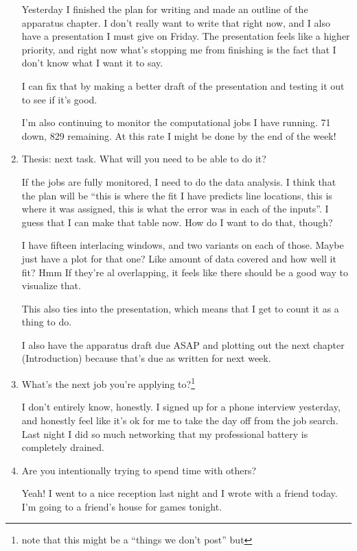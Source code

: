 \documentclass[12pt]{article}
\newcommand{\say}[1]{``#1''}
\renewcommand{\,}{\textsuperscript{,}}
\begin{document}
\begin{enumerate}
Yesterday I finished the plan for writing and made an outline of the apparatus chapter.  
I don't really want to write that right now, and I also have a presentation I must give on Friday.  
The presentation feels like a higher priority, and right now what's stopping me from finishing is the fact that I don't know what I want it to say.

I can fix that by making a better draft of the presentation and testing it out to see if it's good.

I'm also continuing to monitor the computational jobs I have running. 71 down, 829 remaining.  
At this rate I might be done by the end of the week!

\item Thesis: next task. What will you need to be able to do it?

If the jobs are fully monitored, I need to do the data analysis.  
I think that the plan will be \say{this is where the fit I have predicts line locations, this is where it was assigned, this is what the error was in each of the inputs}.  
I guess that I can make that table now.  
How do I want to do that, though?

I have fifteen interlacing windows, and two variants on each of those.  
Maybe just have a plot for that one? Like amount of data covered and how well it fit?  
Hmm If they're al overlapping, it feels like there should be a good way to visualize that.

This also ties into the presentation, which means that I get to count it as a thing to do.

I also have the apparatus draft due ASAP and plotting out the next chapter (Introduction) because that's due as written for next week.

\item What's the next job you're applying to?\footnote{note that this might be a \say{things we don't post} but}

I don't entirely know, honestly. I signed up for a phone interview yesterday, and honestly feel like it's ok for me to take the day off from the job search.  
Last night I did so much networking that my professional battery is completely drained.

\item Are you intentionally trying to spend time with others?

Yeah! I went to a nice reception last night and I wrote with a friend today.  
I'm going to a friend's house for games tonight.


\end{enumerate}
\end{document}
